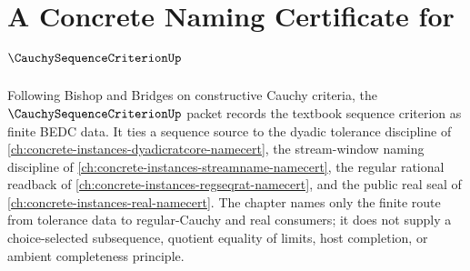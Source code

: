 \chapter{A Concrete Naming Certificate for $\CauchySequenceCriterionUp$}
\label{ch:concrete-instances-cauchy-sequence-criterion-namecert}

Following Bishop and Bridges on constructive Cauchy criteria, the $\CauchySequenceCriterionUp$ packet records the textbook sequence criterion as finite BEDC data. It ties a sequence source to the dyadic tolerance discipline of \autoref{ch:concrete-instances-dyadicratcore-namecert}, the stream-window naming discipline of \autoref{ch:concrete-instances-streamname-namecert}, the regular rational readback of \autoref{ch:concrete-instances-regseqrat-namecert}, and the public real seal of \autoref{ch:concrete-instances-real-namecert}. The chapter names only the finite route from tolerance data to regular-Cauchy and real consumers; it does not supply a choice-selected subsequence, quotient equality of limits, host completion, or ambient completeness principle.


